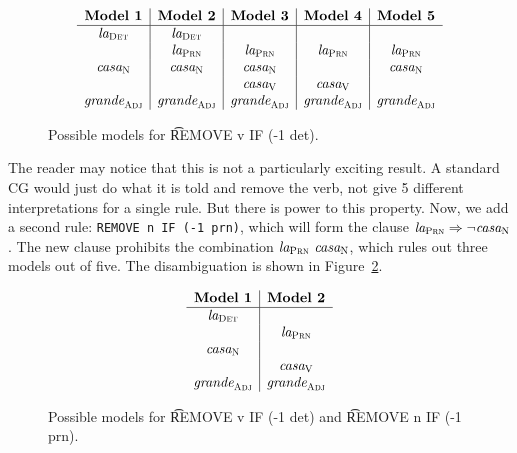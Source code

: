\begin{figure}[h]
\centering
$$\begin{array}{ c | c | c | c | c}
\textbf{Model 1}  & \textbf{Model 2}  & \textbf{Model 3} & \textbf{Model 4} & \textbf{Model 5} \\ \hline
 \laDet   &  \laDet  &         &        &        \\
          &  \laPrn  & \laPrn  & \laPrn & \laPrn \\
 \casaN   &  \casaN  & \casaN  &        & \casaN \\
          &          & \casaV  & \casaV &         \\
\grandeAdj & \grandeAdj & \grandeAdj & \grandeAdj & \grandeAdj \\

\end{array}$$
\caption{Possible models for \t{REMOVE v IF (-1 det)}.}
\label{fig:modelsOneRule}
\end{figure}

The reader may notice that this is not a particularly exciting result. A standard CG would just do what it is told and remove the verb, not give 5 different interpretations for a single rule.
But there is power to this property. Now, we add a second rule: \texttt{REMOVE n IF (-1 prn)}, which will form the clause $\text{\em la}_{\text{\sc Prn}} \Rightarrow \neg \text{\em casa}_{\text{\sc N}}$. The new clause
prohibits the combination $\laPrn \ \casaN$, which rules out three models out of five. The disambiguation is shown in Figure~\ref{fig:modelsTwoRules}.

\begin{figure}[h!]
\centering
$$\begin{array}{ c | c }
 \textbf{Model 1}  & \textbf{Model 2}  \\ \hline
 \laDet   &          \\
          &  \laPrn  \\
 \casaN   &          \\
          &  \casaV   \\
\grandeAdj & \grandeAdj \\

\end{array}$$
\caption{Possible models for \t{REMOVE v IF (-1 det)} and \t{REMOVE n IF (-1 prn)}.}
\label{fig:modelsTwoRules}
\end{figure}


